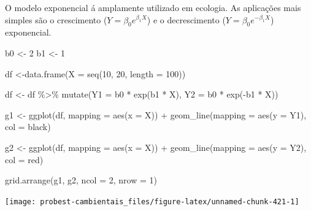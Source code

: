 \documentclass[
]{book}
\newenvironment{Shaded}{\begin{snugshade}}{\end{snugshade}}
\newcommand{\AttributeTok}[1]{\textcolor[rgb]{0.77,0.63,0.00}{#1}}
\newcommand{\DecValTok}[1]{\textcolor[rgb]{0.00,0.00,0.81}{#1}}
\newcommand{\FunctionTok}[1]{\textcolor[rgb]{0.00,0.00,0.00}{#1}}
\newcommand{\NormalTok}[1]{#1}
\newcommand{\OtherTok}[1]{\textcolor[rgb]{0.56,0.35,0.01}{#1}}
\newcommand{\SpecialCharTok}[1]{\textcolor[rgb]{0.00,0.00,0.00}{#1}}
\newcommand{\StringTok}[1]{\textcolor[rgb]{0.31,0.60,0.02}{#1}}
\begin{document}
O modelo exponencial á amplamente utilizado em ecologia. As aplicações mais simples são o crescimento (\(Y = \beta_0 e^{\beta_1 X}\)) e o decrescimento (\(Y = \beta_0 e^{-\beta_1 X}\)) exponencial.

\begin{Shaded}
\begin{Highlighting}[]
\NormalTok{b0 }\OtherTok{\textless{}{-}} \DecValTok{2}
\NormalTok{b1 }\OtherTok{\textless{}{-}} \DecValTok{1}

\NormalTok{df }\OtherTok{\textless{}{-}}\FunctionTok{data.frame}\NormalTok{(}\AttributeTok{X =} \FunctionTok{seq}\NormalTok{(}\DecValTok{10}\NormalTok{, }\DecValTok{20}\NormalTok{, }\AttributeTok{length =} \DecValTok{100}\NormalTok{))}

\NormalTok{df }\OtherTok{\textless{}{-}}\NormalTok{ df }\SpecialCharTok{\%\textgreater{}\%} \FunctionTok{mutate}\NormalTok{(}\AttributeTok{Y1 =}\NormalTok{ b0 }\SpecialCharTok{*} \FunctionTok{exp}\NormalTok{(b1 }\SpecialCharTok{*}\NormalTok{ X),}
                    \AttributeTok{Y2 =}\NormalTok{ b0 }\SpecialCharTok{*} \FunctionTok{exp}\NormalTok{(}\SpecialCharTok{{-}}\NormalTok{b1 }\SpecialCharTok{*}\NormalTok{ X))}

\NormalTok{g1 }\OtherTok{\textless{}{-}} \FunctionTok{ggplot}\NormalTok{(df, }\AttributeTok{mapping =} \FunctionTok{aes}\NormalTok{(}\AttributeTok{x =}\NormalTok{ X)) }\SpecialCharTok{+}
  \FunctionTok{geom\_line}\NormalTok{(}\AttributeTok{mapping =} \FunctionTok{aes}\NormalTok{(}\AttributeTok{y =}\NormalTok{ Y1), }\AttributeTok{col =} \StringTok{\textquotesingle{}black\textquotesingle{}}\NormalTok{)}

\NormalTok{g2 }\OtherTok{\textless{}{-}} \FunctionTok{ggplot}\NormalTok{(df, }\AttributeTok{mapping =} \FunctionTok{aes}\NormalTok{(}\AttributeTok{x =}\NormalTok{ X)) }\SpecialCharTok{+}
  \FunctionTok{geom\_line}\NormalTok{(}\AttributeTok{mapping =} \FunctionTok{aes}\NormalTok{(}\AttributeTok{y =}\NormalTok{ Y2), }\AttributeTok{col =} \StringTok{\textquotesingle{}red\textquotesingle{}}\NormalTok{)}

\FunctionTok{grid.arrange}\NormalTok{(g1, g2, }\AttributeTok{ncol =} \DecValTok{2}\NormalTok{, }\AttributeTok{nrow =} \DecValTok{1}\NormalTok{)}
\end{Highlighting}
\end{Shaded}

\begin{center}\texttt{[image: probest-cambientais\_files/figure-latex/unnamed-chunk-421-1]} \end{center}
\end{document}
